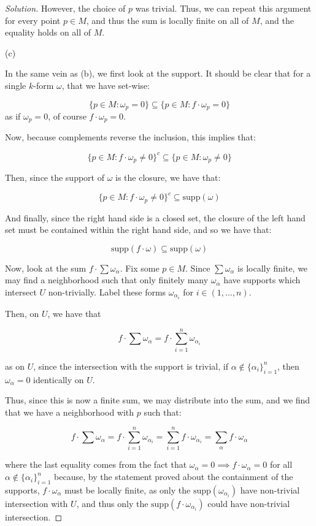 \documentclass[10pt]{article}
\theoremstyle{nonumberplain}%
\begin{document}
\begin{proof}[Solution]
However, the choice of $p$ was trivial. Thus, we can repeat this argument for every point $p \in M$, and thus the sum is locally finite on all of $M$, and the equality holds on all of $M$.

(c)

In the same vein as (b), we first look at the support. It should be clear that for a single $k$-form $\omega$, that we have set-wise:

$$ \{ p \in M : \omega_p = 0 \} \subseteq \{ p \in M :  f \cdot \omega_p = 0 \}$$ as if $\omega_p = 0$, of course $f \cdot \omega_p = 0$. 

Now, because complements reverse the inclusion, this implies that:

$$   \{ p \in M :  f \cdot \omega_p \not= 0 \}^c \subseteq \{ p \in M : \omega_p \not = 0 \}$$

Then, since the support of $\omega$ is the closure, we have that:

$$  \{ p \in M :  f \cdot \omega_p \not= 0 \}^c \subseteq \text{supp}(\omega)$$

And finally, since the right hand side is a closed set, the closure of the left hand set must be contained within the right hand side, and so we have that:

$$ \text{supp}(f \cdot \omega) \subseteq \text{supp}(\omega) $$

Now, look at the sum $ f \cdot \sum \omega_\alpha$. Fix some $p \in M$. Since $\sum \omega_\alpha$ is locally finite, we may find a neighborhood such that only finitely many $\omega_\alpha$ have supports which intersect $U$ non-trivially. Label these forms $\omega_{\alpha_i}$ for $i \in (1,...,n)$.

Then, on $U$, we have that

$$ f \cdot \sum \omega_\alpha = f \cdot \sum_{i=1}^n \omega_{\alpha_i}$$

as on $U$, since the intersection with the support is trivial, if $\alpha \not \in \{ \alpha_i \}_{i=1}^n$, then $\omega_{\alpha} = 0$ identically on $U$.

Thus, since this is now a finite sum, we may distribute into the sum, and we find that we have a neighborhood with $p$ such that:

$$ f \cdot \sum \omega_\alpha = f \cdot \sum_{i=1}^n \omega_{\alpha_i} = \sum_{i=1}^n f \cdot \omega_{\alpha_i} = \sum_{\alpha} f \cdot \omega_\alpha$$

where the last equality comes from the fact that $\omega_\alpha = 0 \implies f \cdot \omega_\alpha = 0$ for all $\alpha \not \in  \{ \alpha_i \}_{i=1}^n$ because, by the statement proved about the containment of the supports, $f \cdot \omega_\alpha$ must be locally finite, as only the $\text{supp}(\omega_{\alpha_i})$ have non-trivial intersection with $U$, and thus only the $\text{supp}(f \cdot \omega_{\alpha_i})$ could have non-trivial intersection.


\end{proof}
\end{document}
